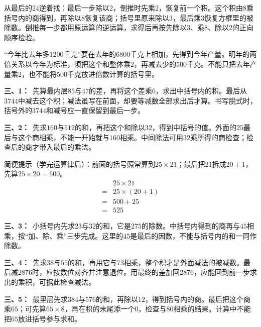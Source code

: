 \documentclass[multi=snippet,border=0pt]{standalone}
\newenvironment{snippet}[3]{\begin{minipage}{#1bp}\color{answerred}\fontsize{#2}{#3}\selectfont\raggedright}{\end{minipage}}
\begin{document}
\begin{snippet}{505}{11.5}{14}从最后的\(24\)逆着找：最后一步除以\(2\)，倒推时先乘\(2\)，恢复前一个积。这个积由\(8\)乘括号内的商得到，再除以\(8\)恢复该商；括号里原来除以\(3\)，最后乘\(3\)恢复方框里的被除数。倒推每一步都用原运算的逆运算，求得后再按先除以\(3\)、乘\(8\)、除以\(2\)的正向顺序检验。\end{snippet}
\begin{snippet}{505}{11.5}{14}“今年比去年多\(1200\)千克”要在去年的\(6800\)千克上相加，先得到今年产量。明年的两倍关系以今年为标准，须把这个和整体乘\(2\)，再减去少的\(500\)千克。不能只把去年产量乘\(2\)，也不能将\(500\)千克放进倍数计算的括号里。\end{snippet}
\begin{snippet}{505}{11.5}{14}\textbf{三、1：}\ 先算最内层\(85\)与\(47\)的差，再将这个差乘\(6\)，求出中括号内的积。最后从\(3744\)中减去这个积；减法虽写在前面，却要等减数全部求出后才算。书写脱式时，括号外的\(3744\)和减号应一直保留到最后一步。\end{snippet}
\begin{snippet}{505}{11.5}{14}\textbf{三、2：}\ 先求\(160\)与\(512\)的和，再把这个和除以\(32\)，得到中括号的值。外面的\(25\)最后与这个商相乘，不能一开始就与\(160\)相乘。中间除法可用\(32\)乘所得的商检查；检查后的商才带入最后的乘法。\par 简便提示（学完运算律后）：前面的括号照常算到\(25\times21\)；最后把\(21\)拆成\(20+1\)，先算\(25\times20=500\)。\[\begin{aligned}&25\times21\\={}&25\times(20+1)\\={}&500+25\\={}&525\end{aligned}\]\end{snippet}
\begin{snippet}{505}{11.5}{14}\textbf{三、3：}\ 小括号内先求\(23\)与\(32\)的和，它是\(275\)的除数。中括号内得到的商再与\(45\)相乘，按“加、除、乘”三步完成。这里的\(45\)是最后的因数，不能与括号内的和一同作除数。\end{snippet}
\begin{snippet}{505}{11.5}{14}\textbf{三、4：}\ 先求\(38\)与\(55\)的和，再用它与\(73\)相乘，整个积才是外面减法的被减数。最后减\(2876\)时，应按数位对齐并注意退位。用最终的差加回\(2876\)，应能回到前一步求出的乘积，可据此检查减法。\end{snippet}
\begin{snippet}{505}{11.5}{14}\textbf{三、5：}\ 最里层先求\(384\)与\(576\)的和，再除以\(12\)，得到括号内的商。最后把这个商乘\(65\)；可先算\(65\times8\)，再在积的末尾添一个\(0\)，检查与\(80\)相乘的结果。计算中不能把\(65\)放进括号参与求和。\end{snippet}
\end{document}
